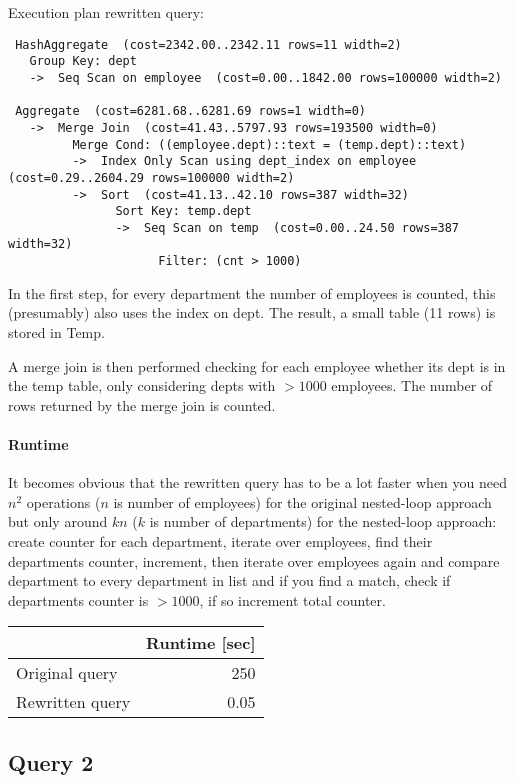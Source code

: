 \documentclass[11pt]{scrartcl}
\begin{document}
Execution plan rewritten query:

\begin{verbatim}
 HashAggregate  (cost=2342.00..2342.11 rows=11 width=2)
   Group Key: dept
   ->  Seq Scan on employee  (cost=0.00..1842.00 rows=100000 width=2)

 Aggregate  (cost=6281.68..6281.69 rows=1 width=0)
   ->  Merge Join  (cost=41.43..5797.93 rows=193500 width=0)
         Merge Cond: ((employee.dept)::text = (temp.dept)::text)
         ->  Index Only Scan using dept_index on employee  (cost=0.29..2604.29 rows=100000 width=2)
         ->  Sort  (cost=41.13..42.10 rows=387 width=32)
               Sort Key: temp.dept
               ->  Seq Scan on temp  (cost=0.00..24.50 rows=387 width=32)
                     Filter: (cnt > 1000)
\end{verbatim}

In the first step, for every department the number of employees is counted,
this (presumably) also uses the index on dept. The result, a small table (11 rows)
is stored in Temp.

A merge join is then performed checking for each employee whether its dept
is in the temp table, only considering depts with $>1000$ employees. The number
of rows returned by the merge join is counted.


\paragraph{Runtime} It becomes obvious that the rewritten query has to
be a lot faster when you need $n^2$ operations ($n$ is number of employees)
for the original nested-loop
approach but only around $kn$ ($k$ is number of departments) for the nested-loop
approach: create counter for each department, iterate over employees,
find their departments counter, increment,
then iterate over employees again and compare department to every department in list
and if you find a match, check if departments counter is $>1000$,
if so increment total counter.


\begin{table}[H]
  \begin{tabular}{l|r}
    & Runtime [sec] \\
   \hline
    Original query & 250\\
    Rewritten query & 0.05\\
  \end{tabular}
\end{table}

\subsection*{Query 2}
\end{document}
